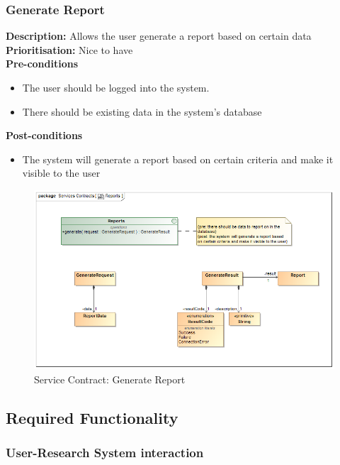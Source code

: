 \documentclass[a4paper]{article}
\begin{document}
        \pagebreak
    \subsubsection{Generate Report}
    	\textbf{Description:} Allows the user generate a report based on certain data\\
    	\textbf{Prioritisation:} Nice to have\\
    	
    	\textbf{Pre-conditions}
    	 \begin{itemize}
    		\item The user should be logged into the system.
    		\item There should be existing data in the system's database
     	\end{itemize}
    	
    	\textbf{Post-conditions}
    	 \begin{itemize}
    		\item The system will generate a report based on certain criteria and make it visible to the user
    	\end{itemize}
    		    	\begin{figure}[H]
    		    		\centering
    		    		\includegraphics[width=\textwidth]{../Assignment1/5.1.17.Generate.Report.Services.Contract.png}
    		    		\caption{Service Contract: Generate Report}
    		    	\end{figure}
    	
        \pagebreak	
    \subsection{Required Functionality}
    \subsubsection{User-Research System interaction}
\end{document}
